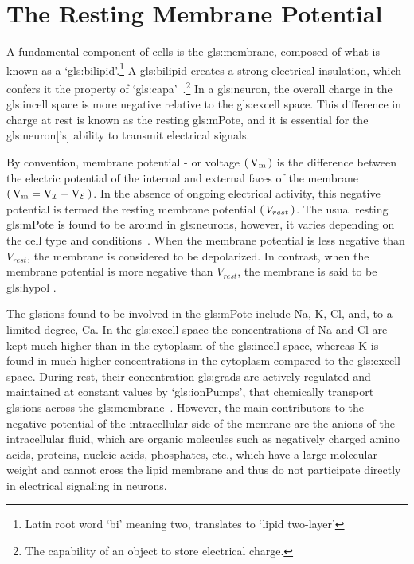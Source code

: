 \documentclass[class={myRUCProject}, crop=false]{standalone}
\begin{document}
\section{The Resting Membrane Potential} 
A fundamental component of cells is the \gls{gls:membrane}, composed of what is known as a `\gls{gls:bilipid}'.{}\footnote{Latin root word `bi' meaning two, translates to `lipid two-layer'} 
A \gls{gls:bilipid} creates a strong electrical insulation, which confers it the property of `\gls{gls:capa}'~\cite{}.{}\footnote{The capability of an object to store electrical charge.}
In a \gls{gls:neuron}, the overall charge in the \gls{gls:incell} space is more negative relative to the \gls{gls:excell} space. This difference in charge at rest is known as the resting \gls{gls:mPote}, and it is essential for the \gls{gls:neuron}['s] ability to transmit electrical signals. 

By convention, membrane potential - or voltage \(\br{\unit{\V\membrane}}\) is the difference between the electric potential of the internal and external faces of the membrane \(\br{\unit{\V\membrane}=\unit{\V\incell}-\unit{\V\excell}}\). In the absence of ongoing electrical activity, this negative potential is termed the resting membrane potential \(\left(\,V_{rest}\,\right)\). The usual resting \gls{gls:mPote} is found to be around  in \glspl{gls:neuron}, however, it varies depending on the cell type and conditions~\cite{}. When the membrane potential is less negative than \(V_{rest}\), the membrane is considered to be depolarized. In contrast, when the membrane potential is more negative than \(V_{rest}\), the membrane is said to be \gls{gls:hypol} \cite{Hammond2015ch3}. 

The \glspl{gls:ion} found to be involved in the \gls{gls:mPote} include \gls{Na}, \gls{K}, \gls{Cl}, and, to a limited degree, \gls{Ca}. 
In the \gls{gls:excell} space the concentrations of \gls{Na} and \gls{Cl} are kept much higher than in the cytoplasm of the \gls{gls:incell} space, whereas \gls{K} is found in much higher concentrations in the cytoplasm compared to the \gls{gls:excell} space. During rest, their concentration \glspl{gls:grad} are actively regulated and maintained at constant values by `\glspl{gls:ionPump}', that chemically transport \glspl{gls:ion} across the \gls{gls:membrane}~\cite{}. However, the main contributors to the negative potential of the intracellular side of the memrane are the anions of the intracellular fluid, which are organic molecules such as negatively charged amino acids, proteins, nucleic acids, phosphates, etc., which have a large molecular weight and cannot cross the lipid membrane and thus do not participate directly in electrical signaling in neurons\cite{Hammond2015ch3}. 
\end{document}
